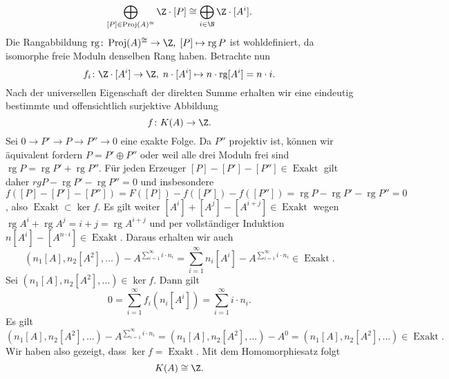 \documentclass{article}
\newcommand{\rg}{\operatorname{rg}}
\begin{document}
$$\bigoplus_{[P] \in \operatorname{Proj}(A)^{\cong}} \Z \cdot [P] \cong \bigoplus_{i\in \N} \Z \cdot [A^i].$$
Die Rangabbildung $\rg\colon \operatorname{Proj}(A)^{\cong} \to \Z,\; [P] \mapsto \rg P$ ist wohldefiniert, da isomorphe freie Moduln denselben Rang haben.
Betrachte nun
\[
    f_i \colon \Z \cdot [A^i] \to \Z,\; n \cdot [A^i] \mapsto n \cdot \rg [A^i] = n \cdot i.
\]
Nach der universellen Eigenschaft der direkten Summe erhalten wir eine eindeutig bestimmte und offensichtlich surjektive Abbildung
\[
    f \colon K(A) \to \Z.
\]
Sei $0 \to P' \to P \to P'' \to 0$ eine exakte Folge. Da $P''$ projektiv ist, können wir äquivalent fordern $P = P' \oplus P''$
oder weil alle drei Moduln frei sind $\rg P = \rg P' + \rg P''$.
Für jeden Erzeuger $[P] - [P'] - [P''] \in \operatorname{Exakt}$ gilt daher $rg P - \rg P' - \rg P'' = 0$
und insbesondere $f([P] - [P'] - [P'']) = F([P]) - f([P']) - f([P'']) = \rg P - \rg P' - \rg P'' = 0$, 
also $\operatorname{Exakt}\subset \ker f$.
Es gilt weiter $[A^i] + [A^j] - [A^{i+j}] \in \operatorname{Exakt}$ wegen $\rg A^i + \rg A^j = i+j = \rg A^{i+j}$
und per vollständiger Induktion $n[A^i] - [A^{n\cdot i}] \in \operatorname{Exakt}$.
Daraus erhalten wir auch 
$$(n_1[A], n_2[A^2], \dots) - A^{\sum_{i = 1}^{\infty} i\cdot n_i} = \sum_{i = 1}^{\infty} n_i[A^i] - A^{\sum_{i = 1}^{\infty} i\cdot n_i} \in \operatorname{Exakt}.$$
Sei $(n_1[A], n_2[A^2], \dots) \in \ker f$. Dann gilt
\[
    0 = \sum_{i = 1}^{\infty} f_i(n_i [A^i]) = \sum_{i = 1}^{\infty} i\cdot n_i.
\]
Es gilt
\[
    (n_1[A], n_2[A^2], \dots) - A^{\sum_{i = 1}^{\infty} i\cdot n_i} = (n_1[A], n_2[A^2], \dots) - A^0 = (n_1[A], n_2[A^2], \dots) \in \operatorname{Exakt}.
\]
Wir haben also gezeigt, dass $\ker f = \operatorname{Exakt}$. Mit dem Homomorphiesatz folgt
\[
    K(A) \cong \Z.
\]
\end{document}
